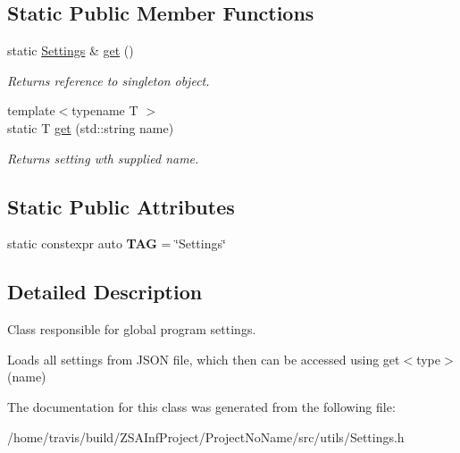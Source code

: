 \subsection*{Static Public Member Functions}
\begin{DoxyCompactItemize}
\item 
\hypertarget{classSettings_a96bb03527cdac607277841c4060669bd}{static \hyperlink{classSettings}{Settings} \& \hyperlink{classSettings_a96bb03527cdac607277841c4060669bd}{get} ()}\label{classSettings_a96bb03527cdac607277841c4060669bd}

\begin{DoxyCompactList}\small\item\em Returns reference to singleton object. \end{DoxyCompactList}\item 
\hypertarget{classSettings_ae1857fbbdf394bc8d6dc5e7a35e62c4f}{{\footnotesize template$<$typename T $>$ }\\static T \hyperlink{classSettings_ae1857fbbdf394bc8d6dc5e7a35e62c4f}{get} (std\-::string name)}\label{classSettings_ae1857fbbdf394bc8d6dc5e7a35e62c4f}

\begin{DoxyCompactList}\small\item\em Returns setting wth supplied name. \end{DoxyCompactList}\end{DoxyCompactItemize}
\subsection*{Static Public Attributes}
\begin{DoxyCompactItemize}
\item 
\hypertarget{classSettings_a30e6a24d2206867d6748fbfb9f87aff0}{static constexpr auto {\bfseries T\-A\-G} = \char`\"{}Settings\char`\"{}}\label{classSettings_a30e6a24d2206867d6748fbfb9f87aff0}

\end{DoxyCompactItemize}


\subsection{Detailed Description}
Class responsible for global program settings. 

Loads all settings from J\-S\-O\-N file, which then can be accessed using get$<$type$>$(name) 

The documentation for this class was generated from the following file\-:\begin{DoxyCompactItemize}
\item 
/home/travis/build/\-Z\-S\-A\-Inf\-Project/\-Project\-No\-Name/src/utils/Settings.\-h\end{DoxyCompactItemize}
